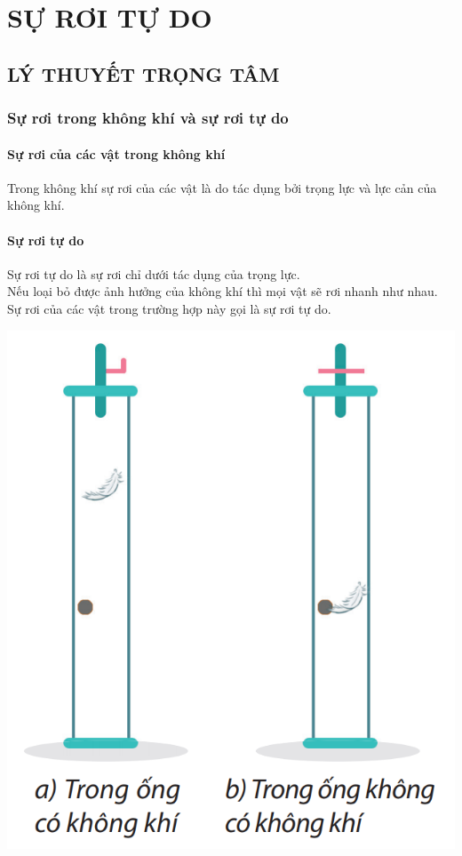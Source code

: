 \section{SỰ RƠI TỰ DO}
\subsection{LÝ THUYẾT TRỌNG TÂM}
\begin{tomtat}
	\subsubsection{Sự rơi trong không khí và sự rơi tự do}
	\paragraph{Sự rơi của các vật trong không khí}
	Trong không khí sự rơi của các vật là do tác dụng bởi trọng lực và lực cản của không khí.
	\paragraph{Sự rơi tự do }
	Sự rơi tự do là sự rơi chỉ dưới tác dụng của trọng lực.\\
	Nếu loại bỏ được ảnh hưởng của không khí thì mọi vật sẽ rơi nhanh như nhau. Sự rơi của các vật trong trường hợp này gọi là sự rơi tự do.
	\begin{center}
		\includegraphics[scale=0.6]{figs/G10Y25B7-1}
	\end{center}

\end{tomtat}
